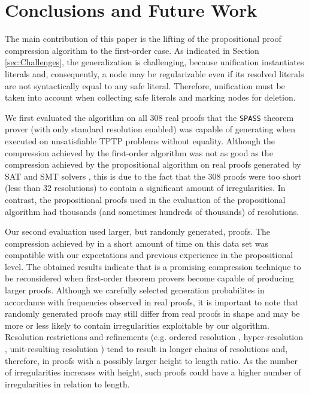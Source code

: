 \section{Conclusions and Future Work}\label{sec:conclusion}

The main contribution of this paper is the lifting of the propositional proof compression algorithm {\RPI} to the first-order case. As indicated in Section \ref{sec:Challenges}, the generalization is challenging, because unification instantiates literals and, consequently, a node may be regularizable even if its resolved literals are not syntactically equal to any safe literal. Therefore, unification must be taken into account when collecting safe literals and marking nodes for deletion.

We first evaluated the algorithm on all 308 real proofs that the \texttt{SPASS} theorem prover (with only standard resolution enabled) was capable of generating when executed on unsatisfiable TPTP problems without equality. Although the compression achieved by the first-order {\FORPI} algorithm was not as good as the compression achieved by the propositional {\RPI} algorithm on real proofs generated by SAT and SMT solvers \cite{LURPI}, this is due to the fact that the 308 proofs were too short (less than 32 resolutions) to contain a significant amount of irregularities. In contrast, the propositional proofs used in the evaluation of the propositional {\RPI} algorithm had thousands (and sometimes hundreds of thousands) of resolutions. 

Our second evaluation used larger, but randomly generated, proofs. The compression achieved by {\FORPI} in a short amount of time on this data set was compatible with our expectations and previous experience in the propositional level. The obtained results indicate that {\FORPI} is a promising compression technique to be reconsidered when first-order theorem provers become capable of producing larger proofs. Although we carefully selected generation probabilites in accordance with frequencies observed in real proofs, it is important to note that randomly generated proofs may still differ from real proofs in shape and may be more or less likely to contain irregularities exploitable by our algorithm. Resolution restrictions and refinements (e.g. ordered resolution \cite{TODO}, hyper-resolution \cite{TODO}, unit-resulting resolution \cite{TODO}) tend to result in longer chains of resolutions and, therefore, in proofs with a possibly larger height to length ratio. As the number of irregularities increases with height, such proofs could have a higher number of irregularities in relation to length.

